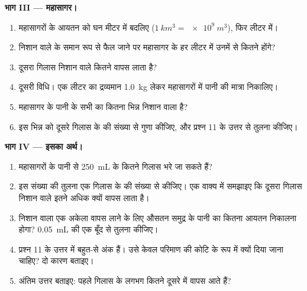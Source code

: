\begin{problem}
\medskip
\noindent\textbf{भाग III --- महासागर।}
\begin{enumerate}[resume]
  \item महासागरों के आयतन को घन मीटर में बदलिए
        ($\qty{1}{km^3} = \qty{e9}{m^3}$), फिर लीटर में।
  \item निशान वाले  के समान रूप से फैल जाने पर महासागर के हर लीटर में
        उनमें से कितने होंगे?
  \item दूसरा गिलास निशान वाले कितने  वापस लाता है?
  \item दूसरी विधि। एक लीटर का द्रव्यमान \qty{1.0}{kg} लेकर महासागरों में पानी
        की मात्रा निकालिए।
  \item महासागर के पानी के सभी  का कितना भिन्न निशान वाला है?
  \item इस भिन्न को दूसरे गिलास के  की संख्या से गुणा कीजिए, और
        प्रश्न 11 के उत्तर से तुलना कीजिए।
\end{enumerate}

\medskip
\noindent\textbf{भाग IV --- इसका अर्थ।}
\begin{enumerate}[resume]
  \item महासागरों के पानी से \qty{250}{mL} के कितने गिलास भरे
        जा सकते हैं?
  \item इस संख्या की तुलना एक गिलास के  की संख्या से कीजिए।
        एक वाक्य में समझाइए कि दूसरा गिलास निशान वाले इतने अधिक 
        क्यों वापस लाता है।
  \item निशान वाला एक अकेला  वापस लाने के लिए औसतन समुद्र के पानी का कितना
        आयतन निकालना होगा? \qty{0.05}{mL} की एक बूँद से
        तुलना कीजिए।
  \item प्रश्न 11 के उत्तर में बहुत-से अंक हैं। उसे केवल परिमाण की
        कोटि के रूप में क्यों दिया जाना चाहिए? दो कारण बताइए।
  \item अंतिम उत्तर बताइए: पहले गिलास के लगभग कितने  दूसरे में
        वापस आते हैं?
\end{enumerate}
\end{problem}

